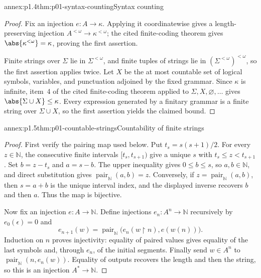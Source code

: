 \begin{annexitem}{annex:p1.4}{thm:p01-syntax-counting}{Syntax counting}
\begin{proof}
Fix an injection \(e:A\to\kappa\).  Applying it coordinatewise gives a
length-preserving injection \(A^{<\omega}\to\kappa^{<\omega}\); the cited
finite-coding theorem gives
\(\abs{\kappa^{<\omega}}=\kappa\), proving the first assertion.

Finite strings over \(\Sigma\) lie in \(\Sigma^{<\omega}\), and finite
tuples of strings lie in \((\Sigma^{<\omega})^{<\omega}\), so the first
assertion applies twice.  Let \(X\) be the at most countable set of logical
symbols, variables, and punctuation adjoined by the fixed grammar.  Since
\(\kappa\) is infinite, item~4 of the cited finite-coding theorem applied to
\(\Sigma,X,\varnothing,\ldots\) gives
\(\abs{\Sigma\cup X}\leq\kappa\).  Every expression generated by a
finitary grammar is a finite string over \(\Sigma\cup X\), so the first
assertion yields the claimed bound.
\end{proof}
\end{annexitem}

\begin{annexitem}{annex:p1.5}{thm:p01-countable-strings}{Countability of finite strings}
\begin{proof}
First verify the pairing map used below.  Put \(t_s=s(s+1)/2\).  For every
\(z\in\mathbb N\), the consecutive finite intervals
\([t_s,t_{s+1})\) give a unique \(s\) with
\(t_s\leq z<t_{s+1}\).  Set \(b=z-t_s\) and \(a=s-b\).  The upper
inequality gives \(0\leq b\leq s\), so \(a,b\in\mathbb N\), and direct
substitution gives \(\operatorname{pair}_{\mathbb N}(a,b)=z\).
Conversely, if \(z=\operatorname{pair}_{\mathbb N}(a,b)\), then
\(s=a+b\) is the unique interval index, and the displayed inverse recovers
\(b\) and then \(a\).  Thus the map is bijective.

Now fix an injection \(e:A\to\mathbb N\).  Define injections
\(e_n:A^n\to\mathbb N\) recursively by
\(e_0(\epsilon)=0\) and
\[
 e_{n+1}(w)=\operatorname{pair}_{\mathbb N}
   \bigl(e_n(w\mathbin{\upharpoonright}n),e(w(n))\bigr).
\]
Induction on \(n\) proves injectivity: equality of paired values gives
equality of the last symbols and, through \(e_n\), of the initial segments.
Finally send \(w\in A^n\) to
\(\operatorname{pair}_{\mathbb N}(n,e_n(w))\).  Equality of outputs recovers
the length and then the string, so this is an injection \(A^*\to\mathbb N\).
\end{proof}
\end{annexitem}

